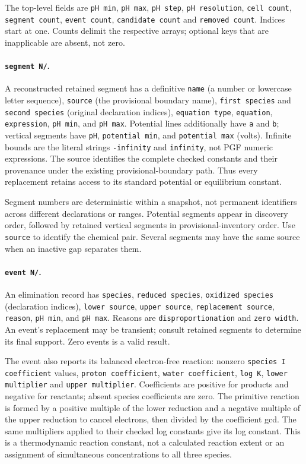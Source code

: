 \documentclass[a4paper,11pt]{ltxdoc}
\begin{document}
The top-level fields are \texttt{pH min}, \texttt{pH max}, \texttt{pH step},
\texttt{pH resolution}, \texttt{cell count}, \texttt{segment count},
\texttt{event count}, \texttt{candidate count} and \texttt{removed count}.
Indices start at one. Counts delimit the respective arrays; optional keys that
are inapplicable are absent, not zero.

\paragraph{\texttt{segment N/}.}
A reconstructed retained segment has a definitive \texttt{name} (a number or
lowercase letter sequence),
\texttt{source} (the provisional boundary name), \texttt{first species} and
\texttt{second species} (original declaration indices), \texttt{equation type},
\texttt{equation}, \texttt{expression}, \texttt{pH min}, and \texttt{pH max}.
Potential lines additionally have \texttt{a} and \texttt{b}; vertical segments
have \texttt{pH}, \texttt{potential min}, and \texttt{potential max} (volts).
Infinite bounds are the literal strings \texttt{-infinity} and \texttt{infinity},
not PGF numeric expressions. The source identifies the complete checked constants
and their provenance under the existing provisional-boundary path. Thus every
replacement retains access to its standard potential or equilibrium constant.

Segment numbers are deterministic within a snapshot, not permanent identifiers
across different declarations or ranges. Potential segments appear in discovery
order, followed by retained vertical segments in provisional-inventory order.
Use \texttt{source} to identify the chemical pair. Several segments may have the
same source when an inactive gap separates them.

\paragraph{\texttt{event N/}.}
An elimination record has \texttt{species}, \texttt{reduced species},
\texttt{oxidized species} (declaration indices), \texttt{lower source},
\texttt{upper source}, \texttt{replacement source}, \texttt{reason},
\texttt{pH min}, and \texttt{pH max}. Reasons are \texttt{disproportionation}
and \texttt{zero width}. An event's replacement may be transient; consult retained
segments to determine its final support. Zero events is a valid result.

The event also reports its balanced electron-free reaction: nonzero
\texttt{species I coefficient} values, \texttt{proton coefficient},
\texttt{water coefficient}, \texttt{log K}, \texttt{lower multiplier} and
\texttt{upper multiplier}. Coefficients are positive for products and negative
for reactants; absent species coefficients are zero. The primitive reaction is
formed by a positive multiple of the lower reduction and a negative multiple of
the upper reduction to cancel electrons, then divided by the coefficient gcd.
The same multipliers applied to their checked log constants give its log constant.
This is a thermodynamic reaction constant, not a calculated reaction extent or
an assignment of simultaneous concentrations to all three species.
\end{document}
